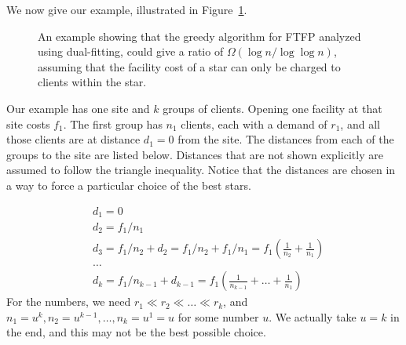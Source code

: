 \documentclass[oneside,final]{ucr}
\def\dsp{\def\baselinestretch{2.0}\large\normalsize}
\def\ssp{\def\baselinestretch{1.0}\large\normalsize}
\begin{document}
We now give our example, illustrated in
Figure~\ref{fig:greedy_lower_bound}.
\ssp
\begin{figure}[ht]
  \centering
  \ssp
  \caption[An $\Omega(\log n / \log\log n)$ example for
  dual-fitting for {\FTFP}]{An example showing that the
    greedy algorithm for FTFP analyzed using dual-fitting,
    could give a ratio of $\Omega(\log n / \log\log n)$,
    assuming that the facility cost of a star can only be
    charged to clients within the star.}
  \dsp
  \label{fig:greedy_lower_bound}
\end{figure}
\dsp
Our example has one site and $k$ groups of clients. Opening
one facility at that site costs $f_1$. The first group has
$n_1$ clients, each with a demand of $r_1$, and all those
clients are at distance $d_1 = 0$ from the site. The
distances from each of the groups to the site are listed
below. Distances that are not shown explicitly are assumed
to follow the triangle inequality. Notice that the distances
are chosen in a way to force a particular choice of the best
stars.

\ssp
\begin{align*}
  &d_1 = 0\\
  &d_2 = f_1 / n_1\\
  &d_3 = f_1/n_2 + d_2 = f_1/n_2 + f_1/n_1 = f_1 (\frac{1}{n_2} + \frac{1}{n_1})\\
  &\ldots\\
  &d_k = f_1/n_{k-1} + d_{k-1} = f_1 (\frac{1}{n_{k-1}} + \ldots + \frac{1}{n_1})
\end{align*}
\dsp
For the numbers, we need $r_1 \ll r_2 \ll \ldots \ll r_k$,
and $n_1 = u^k, n_2 = u^{k-1}, \ldots, n_k = u^1 = u$ for
some number $u$. We actually take $u=k$ in the end, and this
may not be the best possible choice.
\end{document}
